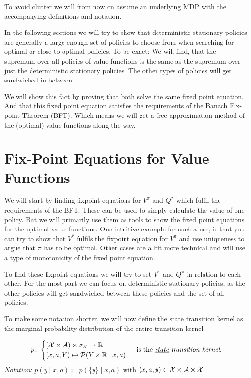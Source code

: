 To avoid clutter we will from now on assume an underlying MDP with the accompanying definitions and notation.

In the following sections we will try to show that deterministic stationary policies are generally a large enough set of policies to choose from when searching for optimal or close to optimal policies. To be exact: We will find, that the supremum over all policies of value functions is the same as the supremum over just the deterministic stationary policies. The other types of policies will get sandwiched in between.

We will show this fact by proving that both solve the same fixed point equation. And that this fixed point equation satisfies the requirements of the Banach Fix-point Theorem (BFT). Which means we will get a free approximation method of the (optimal) value functions along the way.

\section{Fix-Point Equations for Value Functions}
We will start by finding fixpoint equations for \(V^\pi\) and \(Q^\pi\) which fulfil the requirements of the BFT. These can be used to simply calculate the value of one policy. But we will primarily use them as tools to show the fixed point equations for the optimal value functions. One intuitive example for such a use, is that you can try to show that \(V^*\) fulfils the fixpoint equation for \(V^\pi\) and use uniqueness to argue that \(\pi\) has to be optimal. Other cases are a bit more technical and will use a type of monotonicity of the fixed point equation.

To find these fixpoint equations we will try to set \(V^\pi\) and \(Q^\pi\) in relation to each other. For the most part we can focus on deterministic stationary policies, as the other policies will get sandwiched between these policies and the set of all policies.

To make some notation shorter, we will now define the state transition kernel as the marginal probability distribution of the entire transition kernel.

\begin{definition}\leavevmode
\begin{align*}
	p\colon 
	\begin{cases}
		(\mathcal{X}\times\mathcal{A})\times\sigma_{\mathcal{X}}\to\mathbb{R}\\
		(x,a,Y)\mapsto \mathcal{P}(Y\times\mathbb{R}\mid x,a)
	\end{cases}\text{ is the \emph{\underline{state} transition kernel}.}
\end{align*}
\emph{Notation:} \(p(y\mid x,a)\coloneqq p(\{y\}\mid x,a)\) with \((x,a,y)\in\mathcal{X}\times\mathcal{A}\times\mathcal{X}\)
\end{definition}

